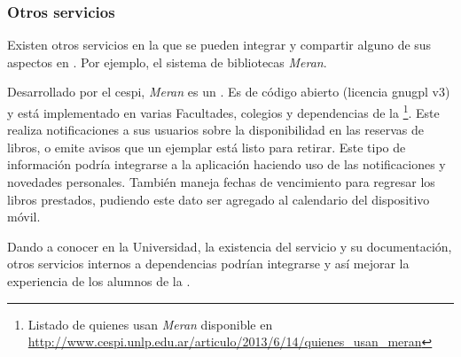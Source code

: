 \subsubsection{Otros servicios}
\label{otros_servicios}

Existen otros servicios en la \unlp que se pueden integrar y compartir alguno de sus aspectos en \nombreApp. 
Por ejemplo, el sistema de bibliotecas \textit{Meran}. 

Desarrollado por el \gls{cespi}, \textit{Meran} es un \cite{meran2017queEs}. Es de código abierto (licencia \gls{gnugpl} v3) y está implementado en varias Facultades, colegios y dependencias de la \unlp\footnote{Listado de quienes usan \textit{Meran} disponible en \url{http://www.cespi.unlp.edu.ar/articulo/2013/6/14/quienes_usan_meran}}. Este realiza notificaciones a sus usuarios sobre la disponibilidad en las reservas de libros, o emite avisos que un ejemplar está listo para retirar. Este tipo de información podría integrarse a la aplicación haciendo uso de las notificaciones y novedades personales. También maneja fechas de vencimiento para regresar los libros prestados, pudiendo este dato ser agregado al calendario del dispositivo móvil.

Dando a conocer en la Universidad, la existencia del servicio \nombreApp y su documentación, otros servicios internos a dependencias podrían integrarse y así mejorar la experiencia de los alumnos de la \unlp.

